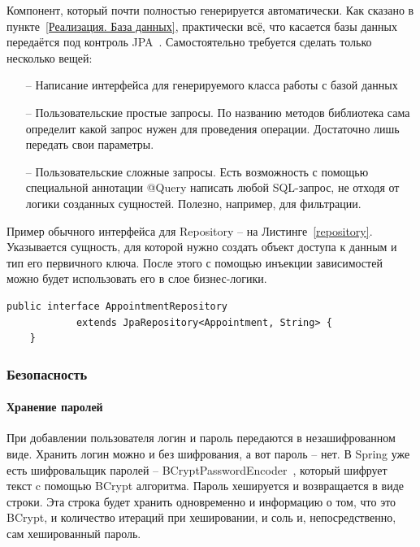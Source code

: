 \documentclass[a4paper,article]{article}
\begin{document}
\begin{sloppypar}
    Компонент, который почти полностью генерируется автоматически. Как сказано в пункте~\ref{Реализация. База данных}, практически всё, что касается базы данных передаётся под контроль JPA~\cite{springguide}. Самостоятельно требуется сделать только несколько вещей:

    \begin{itemize}[nolistsep]
        \item[--] Написание интерфейса для генерируемого класса работы с базой данных
        \item[--] Пользовательские простые запросы. По названию методов библиотека сама определит какой запрос нужен для проведения операции. Достаточно лишь передать свои параметры.
        \item[--] Пользовательские сложные запросы. Есть возможность с помощью специальной аннотации @Query написать любой SQL-запрос, не отходя от логики созданных сущностей. Полезно, например, для фильтрации.
    \end{itemize}

    \newpage

    Пример обычного интерфейса для Repository -- на Листинге~\ref{repository}. Указывается сущность, для которой нужно создать объект доступа к данным и тип его первичного ключа. После этого с помощью инъекции зависимостей~\cite{springguide} можно будет использовать его в слое бизнес-логики.

    \begin{lstlisting}[label=repository,caption=Пример интерфейса для репозитория]
    public interface AppointmentRepository
            extends JpaRepository<Appointment, String> {
    }
    \end{lstlisting}

    \subsubsection{Безопасность}\label{Реализация. Сервер. Безопасность}

    \paragraph{Хранение паролей}

    При добавлении пользователя логин и пароль передаются в незашифрованном виде. Хранить логин можно и без шифрования, а вот пароль -- нет. В Spring уже есть шифровальщик паролей -- BCryptPasswordEncoder~\cite{baeldungbook, springguide}, который шифрует текст c помощью BCrypt алгоритма. Пароль хешируется и возвращается в виде строки. Эта строка будет хранить одновременно и информацию о том, что это BCrypt, и количество итераций при хешировании, и соль и, непосредственно, сам хешированный пароль.


\end{sloppypar}
\end{document}
